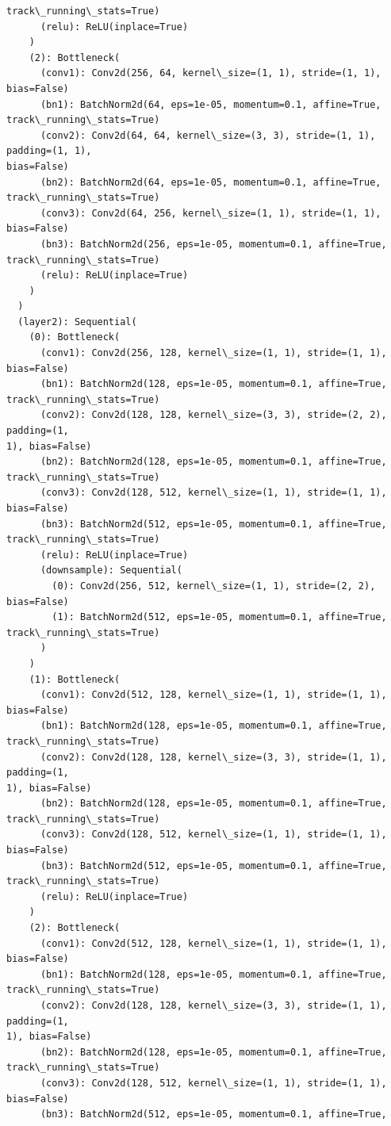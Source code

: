 \documentclass[11pt]{article}
\begin{document}
\begin{tcolorbox}[breakable, size=fbox, boxrule=.5pt, pad at break*=1mm, opacityfill=0]
\begin{Verbatim}[commandchars=\\\{\}]
track\_running\_stats=True)
      (relu): ReLU(inplace=True)
    )
    (2): Bottleneck(
      (conv1): Conv2d(256, 64, kernel\_size=(1, 1), stride=(1, 1), bias=False)
      (bn1): BatchNorm2d(64, eps=1e-05, momentum=0.1, affine=True,
track\_running\_stats=True)
      (conv2): Conv2d(64, 64, kernel\_size=(3, 3), stride=(1, 1), padding=(1, 1),
bias=False)
      (bn2): BatchNorm2d(64, eps=1e-05, momentum=0.1, affine=True,
track\_running\_stats=True)
      (conv3): Conv2d(64, 256, kernel\_size=(1, 1), stride=(1, 1), bias=False)
      (bn3): BatchNorm2d(256, eps=1e-05, momentum=0.1, affine=True,
track\_running\_stats=True)
      (relu): ReLU(inplace=True)
    )
  )
  (layer2): Sequential(
    (0): Bottleneck(
      (conv1): Conv2d(256, 128, kernel\_size=(1, 1), stride=(1, 1), bias=False)
      (bn1): BatchNorm2d(128, eps=1e-05, momentum=0.1, affine=True,
track\_running\_stats=True)
      (conv2): Conv2d(128, 128, kernel\_size=(3, 3), stride=(2, 2), padding=(1,
1), bias=False)
      (bn2): BatchNorm2d(128, eps=1e-05, momentum=0.1, affine=True,
track\_running\_stats=True)
      (conv3): Conv2d(128, 512, kernel\_size=(1, 1), stride=(1, 1), bias=False)
      (bn3): BatchNorm2d(512, eps=1e-05, momentum=0.1, affine=True,
track\_running\_stats=True)
      (relu): ReLU(inplace=True)
      (downsample): Sequential(
        (0): Conv2d(256, 512, kernel\_size=(1, 1), stride=(2, 2), bias=False)
        (1): BatchNorm2d(512, eps=1e-05, momentum=0.1, affine=True,
track\_running\_stats=True)
      )
    )
    (1): Bottleneck(
      (conv1): Conv2d(512, 128, kernel\_size=(1, 1), stride=(1, 1), bias=False)
      (bn1): BatchNorm2d(128, eps=1e-05, momentum=0.1, affine=True,
track\_running\_stats=True)
      (conv2): Conv2d(128, 128, kernel\_size=(3, 3), stride=(1, 1), padding=(1,
1), bias=False)
      (bn2): BatchNorm2d(128, eps=1e-05, momentum=0.1, affine=True,
track\_running\_stats=True)
      (conv3): Conv2d(128, 512, kernel\_size=(1, 1), stride=(1, 1), bias=False)
      (bn3): BatchNorm2d(512, eps=1e-05, momentum=0.1, affine=True,
track\_running\_stats=True)
      (relu): ReLU(inplace=True)
    )
    (2): Bottleneck(
      (conv1): Conv2d(512, 128, kernel\_size=(1, 1), stride=(1, 1), bias=False)
      (bn1): BatchNorm2d(128, eps=1e-05, momentum=0.1, affine=True,
track\_running\_stats=True)
      (conv2): Conv2d(128, 128, kernel\_size=(3, 3), stride=(1, 1), padding=(1,
1), bias=False)
      (bn2): BatchNorm2d(128, eps=1e-05, momentum=0.1, affine=True,
track\_running\_stats=True)
      (conv3): Conv2d(128, 512, kernel\_size=(1, 1), stride=(1, 1), bias=False)
      (bn3): BatchNorm2d(512, eps=1e-05, momentum=0.1, affine=True,

\end{Verbatim}
\end{tcolorbox}
\end{document}
